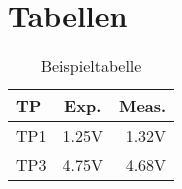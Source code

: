 \documentclass[a4paper, 10pt, fleqn]{article}
\begin{document}
\section{Tabellen}
\begin{table}[h!]
    \centering
    \begin{tabular}{l|c|r}
        TP  & Exp.  & Meas. \\
        \hline
        TP1 & 1.25V & 1.32V \\
        TP3 & 4.75V & 4.68V \\
    \end{tabular}
    \caption{Beispieltabelle}
    \label{tab:example}
\end{table}
\end{document}
